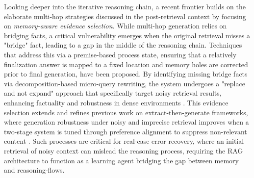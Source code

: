 \documentclass[11pt,a4paper]{article}
\begin{document}
Looking deeper into the iterative reasoning chain, a recent frontier builds on the elaborate multi-hop strategies discussed in the post-retrieval context by focusing on \emph{memory-aware evidence selection}. While multi-hop generation relies on bridging facts, a critical vulnerability emerges when the original retrieval misses a "bridge" fact, leading to a gap in the middle of the reasoning chain. Techniques that address this via a premise-based process state, ensuring that a relatively finalization answer is mapped to a fixed location and memory holes are corrected prior to final generation, have been proposed. By identifying missing bridge facts via decomposition-based micro-query rewriting, the system undergoes a "replace and not expand" approach that specifically target noisy retrieval results, enhancing factuality and robustness in dense environments \cite{arxiv:2503.04789v3}. This evidence selection extends and refines previous work on extract-then-generate frameworks, where generation robustness under noisy and imprecise retrieval improves when a two-stage system is tuned through preference alignment to suppress non-relevant content \cite{arxiv:2503.04789v3}. Such processes are critical for real-case error recovery, where an initial retrieval of noisy context can mislead the reasoning process, requiring the RAG architecture to function as a learning agent bridging the gap between memory and reasoning-flows.
\end{document}
